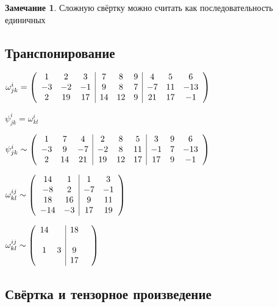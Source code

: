 \documentclass{book}
\theoremstyle{definition}
\newtheorem*{note}{Замечание}
\begin{document}
\begin{note}
    Сложную свёртку можно считать как последовательность единичных
\end{note}

\subsection{Транспонирование}

$\omega^i_{jk} = \left( 
    \begin{array}{c c c| c c c| c c c}
        1 & 2 & 3 & 7 & 8 & 9 & 4 & 5 & 6\\
        -3 & -2 & -1 & 9 & 8 & 7 & -7 & 11 & -13\\
        2 & 19 & 17 & 14 & 12 & 9 & 21 & 17 & -1\\
    \end{array}
\right) $

$\psi_{jk}^i = \omega_{kl}^i$

$\psi_{jk}^{i} \sim \left( 
    \begin{array}{c c c | c c c| c c c}
        1 & 7 & 4 & 2 & 8 & 5 & 3 & 9 & 6\\
        -3 & 9 & -7 & -2 & 8 & 11 & -1 & 7 & -13\\
        2 & 14 & 21 & 19 & 12 & 17 & 17 & 9 & -1\\
\end{array}
\right) $ 

$\omega^{ij}_{kl} \sim \left( 
    \begin{array}{c c | c c }
        14 & 1 & 1 & 3\\
        -8 & 2 & -7 & -1\\
        18 & 16 & 9 & 11\\
        -14 & -3 & 17 & 19\\
\end{array}
\right) $ 


$\omega^{ij}_{kl} \sim \left( 
    \begin{array}{c c | c c}
        14 & & 18 & \\
           &&& \\
        1 & 3 & 9 &\\
          &&17&\\
\end{array}
\right) $


\subsection{Свёртка и тензорное произведение}
\end{document}
